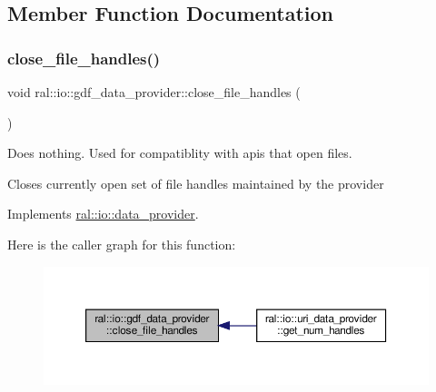 \subsection{Member Function Documentation}
\mbox{\label{classral_1_1io_1_1gdf__data__provider_a4a78cce759b9bee4d09ceee3014644d2}} 
\subsubsection{\texorpdfstring{close\+\_\+file\+\_\+handles()}{close\_file\_handles()}}
{\footnotesize\ttfamily void ral\+::io\+::gdf\+\_\+data\+\_\+provider\+::close\+\_\+file\+\_\+handles (\begin{DoxyParamCaption}{ }\end{DoxyParamCaption})\hspace{0.3cm}{\ttfamily [virtual]}}

Does nothing. Used for compatiblity with apis that open files.

Closes currently open set of file handles maintained by the provider 

Implements \hyperlink{classral_1_1io_1_1data__provider_afa6216bccde854b011ed098e114ba8b3}{ral\+::io\+::data\+\_\+provider}.

Here is the caller graph for this function\+:\nopagebreak
\begin{figure}[H]
\begin{center}
\leavevmode
\includegraphics[width=350pt]{classral_1_1io_1_1gdf__data__provider_a4a78cce759b9bee4d09ceee3014644d2_icgraph}
\end{center}
\end{figure}
\mbox{\label{classral_1_1io_1_1gdf__data__provider_a31af9987a3a5e548954ea5597622b61f}} 
